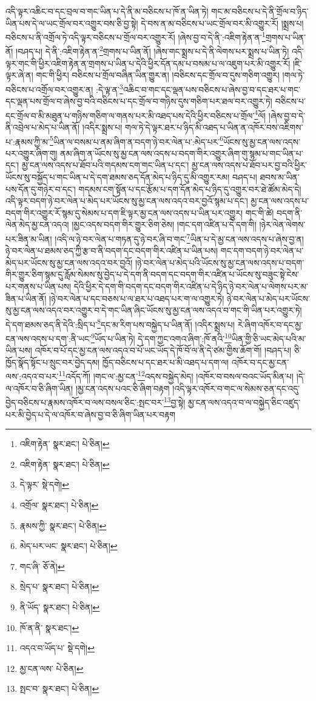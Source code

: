 འདི་ལྟར་འཆིང་བ་དང་བྲལ་བ་གང་ཡིན་པ་དེ་ནི་མ་བཅིངས་པ་ཁོ་ན་ཡིན་ཏེ། གང་མ་བཅིངས་པ་དེ་ནི་གྲོལ་བ་ཉིད་ཡིན་པས་དེ་ལ་ཡང་གྲོལ་བར་འགྱུར་བས་ཅི་བྱ་སྟེ། དེ་བས་ན་མ་བཅིངས་པ་ཡང་གྲོལ་བར་མི་འགྱུར་རོ། །སྨྲས་པ། བཅིངས་པ་ནི་འགྲོལ་ཏེ་འདི་ལྟར་བཅིངས་པ་གྲོལ་བར་འགྱུར་རོ། །ཞེས་བྱ་བ་དེ་ནི་:འཇིག་རྟེན་ན་\footnote{འཇིག་རྟེན་  སྣར་ཐང་།  པེ་ཅིན། }གྲགས་པ་ཡིན་ནོ། །བཤད་པ། དེ་ནི་:འཇིག་རྟེན་ན་\footnote{འཇིག་རྟེན་  སྣར་ཐང་།  པེ་ཅིན། }གྲགས་པ་ཡིན་ནོ། །ཞེས་གང་སྨྲས་པ་དེ་ནི་ལེགས་པར་སྨྲས་པ་ཡིན་ཏེ། འདི་ལྟར་གང་གི་ཕྱིར་འཇིག་རྟེན་ན་གྲགས་པ་ཡིན་པ་དེའི་ཕྱིར་དོན་དམ་པ་བསམ་པ་ལ་འཇུག་པར་མི་འགྱུར་རོ། །ཇི་ལྟར་ཞེ་ན། གང་གི་ཕྱིར། བཅིངས་པ་གྲོལ་བཞིན་ཡིན་གྱུར་ན། །བཅིངས་དང་གྲོལ་བ་དུས་གཅིག་འགྱུར། །གལ་ཏེ་བཅིངས་པ་འགྲོལ་བར་འགྱུར་ན། :དེ་ལྟ་ན་\footnote{དེ་ལྟར་  སྡེ་དགེ། }འཆིང་བ་གང་དང་ལྡན་པས་བཅིངས་པ་ཞེས་བྱ་བ་དང་ཐར་པ་གང་དང་ལྡན་པས་གྲོལ་བ་ཞེས་བྱ་བའི་བཅིངས་པ་དང་གྲོལ་བ་གཉིས་དུས་གཅིག་པར་ཐལ་བར་འགྱུར་ཏེ། བཅིངས་པ་དང་གྲོལ་བ་མི་མཐུན་པ་གཉིས་གཅིག་ལ་གནས་པར་མི་འཐད་པས་དེའི་ཕྱིར་བཅིངས་པ་གྲོལ་\footnote{འགྲོལ་  སྣར་ཐང་།  པེ་ཅིན། }ལོ། །ཞེས་བྱ་བ་དེ་ནི་འབྲེལ་པ་མེད་པ་ཡིན་ནོ། །འདིར་སྨྲས་པ། གལ་ཏེ་དེ་ལྟར་ཐར་པ་ཉིད་མི་འཐད་པ་ཡིན་ན་འཁོར་བས་འཇིགས་པ་:རྣམས་ཀྱི་མ་\footnote{རྣམས་ཀྱི་  སྣར་ཐང་།  པེ་ཅིན། }ཡིན་ལ་བསམ་པ་ནམ་ཞིག་ན་བདག་ཉེ་བར་ལེན་པ་:མེད་པར་\footnote{མེད་པར་ཡང་  སྣར་ཐང་།  པེ་ཅིན། }ཡོངས་སུ་མྱ་ངན་ལས་འདས་པར་འགྱུར་ཞིག་གུ། ནམ་ཞིག་ན་ཡོངས་སུ་མྱ་ངན་ལས་འདས་པ་བདག་གིར་འགྱུར་ཞིག་གུ་སྙམ་པ་གང་ཡིན་པ་དང་། མྱ་ངན་ལས་འདས་པ་ཐོབ་པའི་གདམས་ངག་གང་ཡིན་པ་དང་། མྱ་ངན་ལས་འདས་པ་ཐོབ་པར་བྱ་བའི་ཕྱིར་ཡོངས་སུ་བསྐྱོད་པ་གང་ཡིན་པ་དེ་དག་ཐམས་ཅད་དོན་མེད་པ་ཉིད་དུ་མི་འགྱུར་རམ། བཤད་པ། ཐབས་མ་ཡིན་པས་དོན་དུ་གཉེར་བ་དང་། གདམས་ངག་སྟོན་པ་དང་རྩོམ་པ་དག་དོན་མེད་པ་ཉིད་དུ་འགྱུར་བར་ཐེ་ཚོམ་མེད་དེ། འདི་ལྟར་བདག་ཉེ་བར་ལེན་པ་མེད་པར་ཡོངས་སུ་མྱ་ངན་ལས་འདའ་བར་བྱའོ་སྙམ་པ་དང་། མྱ་ངན་ལས་འདས་པ་བདག་གིར་འགྱུར་རོ་སྙམ་དུ་སེམས་པ་དག་ཇི་ལྟར་མྱ་ངན་ལས་འདས་པ་ཡིན་པར་འགྱུར། གང་གི་ཚེ། བདག་ནི་ལེན་མེད་མྱ་ངན་འདའ། །མྱང་འདས་བདག་གིར་གྱུར་ཅིག་ཅེས། །གང་དག་འཛིན་པ་དེ་དག་གི། །ཉེར་ལེན་ལེགས་པར་ཟིན་མ་ཡིན། །འདི་ལ་ཉེ་བར་ལེན་པ་གཏན་དུ་ཉེ་བར་ཞི་བ་གང་\footnote{གང་ཞི་  ཅོ་ནེ། }ཡིན་པ་དེ་མྱ་ངན་ལས་འདས་པ་ཞེས་བྱ་ན། ཉེ་བར་ལེན་པ་ཐམས་ཅད་ཀྱི་རྩ་བ་ནི་བདག་དང་བདག་གིར་འཛིན་པ་ཡིན་པས། གང་དག་བདག་ཉེ་བར་ལེན་པ་མེད་པར་ཡོངས་སུ་མྱ་ངན་ལས་འདའ་བར་བྱའོ། །ཉེ་བར་ལེན་པ་མེད་པའི་ཡོངས་སུ་མྱ་ངན་ལས་འདས་པ་བདག་གིར་གྱུར་ཅིག་སྙམ་དུ་རློམ་སེམས་སུ་བྱེད་པ་དེ་དག་ནི་བདག་དང་བདག་གིར་འཛིན་པ་ཡོངས་སུ་བཟུང་སྟེ་ངེས་པར་གནས་པ་ཡིན་པས། དེའི་ཕྱིར་དེ་དག་གི་བདག་དང་བདག་གིར་འཛིན་པ་དེ་ཉིད་ཉེ་བར་ལེན་པ་ལེགས་པར་མ་ཟིན་པ་ཡིན་ནོ། །ཉེ་བར་ལེན་པ་དང་བཅས་པ་ལ་ཐར་པ་འཐད་པར་ག་ལ་འགྱུར་ཏེ། ཉེ་བར་ལེན་པ་མེད་པར་ཡོངས་སུ་མྱ་ངན་ལས་འདའ་བར་འགྱུར་བ་དེ་གང་ཡིན་ཞིང་ཡོངས་སུ་མྱ་ངན་ལས་འདའ་བ་གང་གི་ཡིན་པར་འགྱུར་ཏེ། དེ་དག་ཐམས་ཅད་ནི་དེའི་:སྲིད་པ་\footnote{སྲེད་པ་  སྣར་ཐང་།  པེ་ཅིན། }དང་མ་རིག་པས་བསྐྱེད་པ་ཡིན་ནོ། །འདིར་སྨྲས་པ། རེ་ཞིག་འཁོར་བ་དང་མྱ་ངན་ལས་འདས་པ་དག་:ནི་ཡང་\footnote{ནི་ཡོད་  སྣར་ཐང་།  པེ་ཅིན། }ཡོད་པ་ཡིན་ཏེ། དེ་དག་ཀྱང་འགའ་ཞིག་:ཁོ་ནའི་\footnote{ཁོ་ན་ནི་  སྣར་ཐང་། }ཡིན་གྱི་ཅི་ཡང་མེད་པའི་མ་ཡིན་པས། འཁོར་བ་པོ་དང་མྱ་ངན་ལས་འདའ་བ་པོ་ཡང་ཡོད་དེ་ཁོ་བོ་ལ་ནི་དེ་ཙམ་གྱིས་ཆོག་གོ། །བཤད་པ། ཅི་ཁྱོད་སྣོད་སྟོང་པ་སྲུང་བར་བྱེད་དམ། ཁྱོད་བཅིངས་པ་དང་ཐར་པ་མི་འཐད་པ་དག་ལ། འཁོར་བ་དང་མྱ་ངན་ལས་:འདའ་བ་པར་\footnote{འདའ་བ་ཡོད་པ་  སྡེ་དགེ། }འདོད་ཀོ། །གང་ལ་:མྱ་ངན་\footnote{མྱ་ངན་ལས་  པེ་ཅིན། }འདས་བསྐྱེད་མེད། །འཁོར་བ་བསལ་བའང་ཡོད་མིན་པ། །དེ་ལ་འཁོར་བ་ཅི་ཞིག་ཡིན། །མྱ་ངན་འདས་པའང་ཅི་ཞིག་བརྟག །འདི་ལྟར་འཁོར་བ་གང་ལ་སེམས་ཅན་དང་འདུ་བྱེད་བཅིངས་པ་རྣམས་འཁོར་བ་ལས་བསལ་ཅིང་:སྤང་བར་\footnote{སྤང་བ་  སྣར་ཐང་།  པེ་ཅིན། }བྱ་སྟེ། མྱ་ངན་ལས་འདའ་བ་ལ་བསྐྱེད་ཅིང་འཛུད་པར་མི་བྱེད་པ་དེ་ལ་འཁོར་བ་ཞེས་བྱ་བ་ཅི་ཞིག་ཡིན་པར་བརྟག 